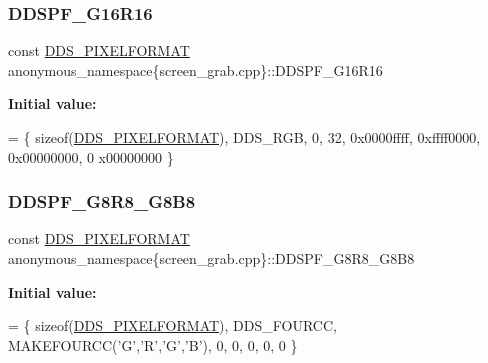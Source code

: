 \subsubsection{\texorpdfstring{D\+D\+S\+P\+F\+\_\+\+G16\+R16}{DDSPF\_G16R16}}
{\footnotesize\ttfamily const \mbox{\hyperlink{structanonymous__namespace_02screen__grab_8cpp_03_1_1_d_d_s___p_i_x_e_l_f_o_r_m_a_t}{D\+D\+S\+\_\+\+P\+I\+X\+E\+L\+F\+O\+R\+M\+AT}} anonymous\+\_\+namespace\{screen\+\_\+grab.\+cpp\}\+::D\+D\+S\+P\+F\+\_\+\+G16\+R16}

{\bfseries Initial value\+:}
\begin{DoxyCode}
=
        \{ \textcolor{keyword}{sizeof}(\mbox{\hyperlink{struct_d_d_s___p_i_x_e_l_f_o_r_m_a_t}{DDS\_PIXELFORMAT}}), DDS\_RGB,  0, 32, 0x0000ffff, 0xffff0000, 0x00000000, 0
      x00000000 \}
\end{DoxyCode}
\mbox{\label{namespaceanonymous__namespace_02screen__grab_8cpp_03_a4db9820aea2940ea6f10d8c93605b6d1}} 
\subsubsection{\texorpdfstring{D\+D\+S\+P\+F\+\_\+\+G8\+R8\+\_\+\+G8\+B8}{DDSPF\_G8R8\_G8B8}}
{\footnotesize\ttfamily const \mbox{\hyperlink{structanonymous__namespace_02screen__grab_8cpp_03_1_1_d_d_s___p_i_x_e_l_f_o_r_m_a_t}{D\+D\+S\+\_\+\+P\+I\+X\+E\+L\+F\+O\+R\+M\+AT}} anonymous\+\_\+namespace\{screen\+\_\+grab.\+cpp\}\+::D\+D\+S\+P\+F\+\_\+\+G8\+R8\+\_\+\+G8\+B8}

{\bfseries Initial value\+:}
\begin{DoxyCode}
=
        \{ \textcolor{keyword}{sizeof}(\mbox{\hyperlink{struct_d_d_s___p_i_x_e_l_f_o_r_m_a_t}{DDS\_PIXELFORMAT}}), DDS\_FOURCC, MAKEFOURCC(\textcolor{charliteral}{'G'},\textcolor{charliteral}{'R'},\textcolor{charliteral}{'G'},\textcolor{charliteral}{'B'}), 0, 0, 0, 0, 0 \}
\end{DoxyCode}
\mbox{\label{namespaceanonymous__namespace_02screen__grab_8cpp_03_ac9203901cc12a56d71b2ef24f43ac012}} 
